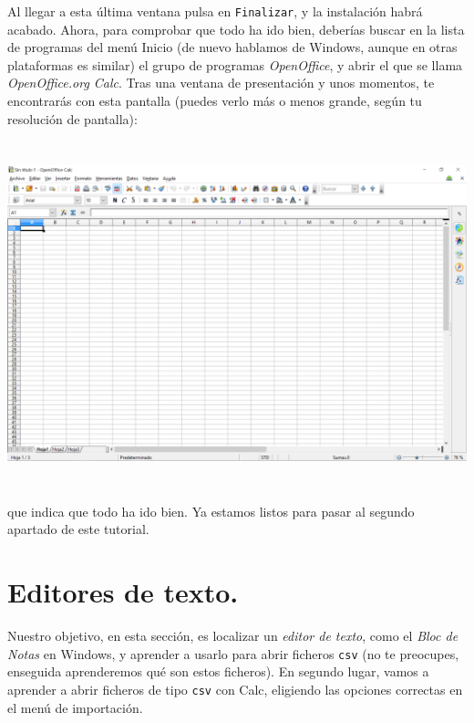 \documentclass[10pt,a4paper]{article}
\newcounter {cont01}
\begin{document}
Al llegar a esta última ventana pulsa en {\tt Finalizar}, y la instalación habrá acabado. Ahora,
para comprobar que todo ha ido bien, deberías buscar en la lista de programas del menú Inicio (de
nuevo hablamos de Windows, aunque en otras plataformas es similar) el grupo de programas {\em
OpenOffice}, y abrir el que se llama {\em OpenOffice.org Calc}. Tras una ventana de presentación y
unos momentos, te encontrarás con esta pantalla (puedes verlo más o menos grande, según tu
resolución de pantalla):
    \begin{center}
    \includegraphics[height=10cm]{../fig/Tut00-OpenOffice-10-201605.png}
    \end{center}
que indica que todo ha ido bien. Ya estamos listos para pasar al segundo apartado de este tutorial.

\section{Editores de texto.}
\label{tut01:sec:EditoresTexto}

Nuestro objetivo, en esta sección, es localizar un {\em editor de texto}, como el {\em Bloc de
Notas} en Windows, y aprender a usarlo para abrir ficheros {\tt csv} (no te preocupes, enseguida
aprenderemos qué son estos ficheros). En segundo lugar, vamos a aprender a abrir ficheros de tipo
{\tt csv}  con Calc, eligiendo las opciones correctas en el menú de importación.
\end{document}
